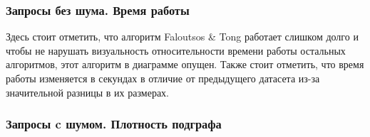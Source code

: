 \subsubsection{Запросы без шума. Время работы}

  \begin{center}
  \end{center}

Здесь стоит отметить, что алгоритм Faloutsos \& Tong \cite{Faloutsos06} работает слишком долго и чтобы не нарушать визуальность относительности времени работы остальных алгоритмов, этот алгоритм в диаграмме опущен. Также стоит отметить, что время работы изменяется в секундах в отличие от предыдущего датасета из-за значительной разницы в их размерах.

\subsubsection{Запросы c шумом. Плотность подграфа}

  \begin{center}
  \end{center}

